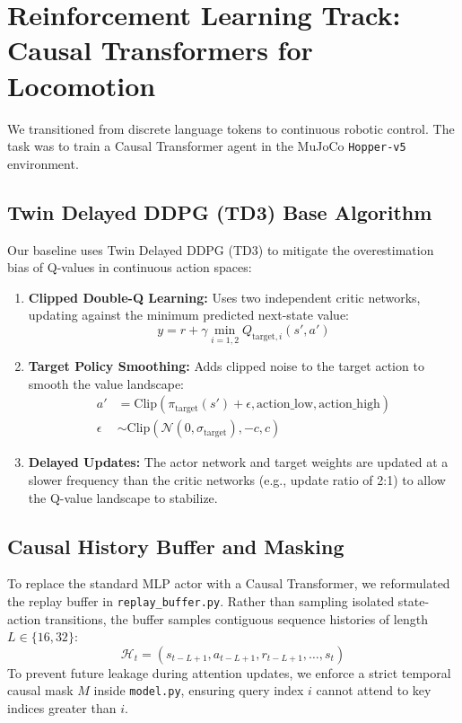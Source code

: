 \documentclass[11pt,a4paper]{article}
\begin{document}
\newpage

\section{Reinforcement Learning Track: Causal Transformers for Locomotion}
We transitioned from discrete language tokens to continuous robotic control. The task was to train a Causal Transformer agent in the MuJoCo \texttt{Hopper-v5} environment.

\subsection{Twin Delayed DDPG (TD3) Base Algorithm}
Our baseline uses Twin Delayed DDPG (TD3) to mitigate the overestimation bias of Q-values in continuous action spaces:
\begin{enumerate}
    \item \textbf{Clipped Double-Q Learning:} Uses two independent critic networks, updating against the minimum predicted next-state value:
    \begin{equation}
    y = r + \gamma \min_{i=1,2} Q_{\text{target},i}(s', a')
    \end{equation}
    \item \textbf{Target Policy Smoothing:} Adds clipped noise to the target action to smooth the value landscape:
    \begin{align}
    a' &= \text{Clip}(\pi_{\text{target}}(s') + \epsilon, \text{action\_low}, \text{action\_high}) \\
    \epsilon &\sim \text{Clip}(\mathcal{N}(0, \sigma_{\text{target}}), -c, c)
    \end{align}
    \item \textbf{Delayed Updates:} The actor network and target weights are updated at a slower frequency than the critic networks (e.g., update ratio of 2:1) to allow the Q-value landscape to stabilize.
\end{enumerate}

\subsection{Causal History Buffer and Masking}
To replace the standard MLP actor with a Causal Transformer, we reformulated the replay buffer in \texttt{replay\_buffer.py}. Rather than sampling isolated state-action transitions, the buffer samples contiguous sequence histories of length $L \in \{16, 32\}$:
\begin{equation}
\mathcal{H}_t = (s_{t-L+1}, a_{t-L+1}, r_{t-L+1}, \dots, s_t)
\end{equation}
To prevent future leakage during attention updates, we enforce a strict temporal causal mask $M$ inside \texttt{model.py}, ensuring query index $i$ cannot attend to key indices greater than $i$.
\end{document}
